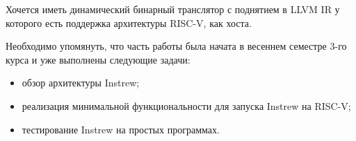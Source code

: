 Хочется иметь динамический бинарный транслятор с поднятием в LLVM IR у которого есть поддержка архитектуры RISC-V, как хоста.

Необходимо упомянуть, что часть работы была начата в весеннем семестре 3-го курса и уже выполнены следующие задачи:
\begin{itemize}
    \item обзор архитектуры Instrew;
    \item реализация минимальной функциональности для запуска Instrew на RISC-V;
    \item тестирование Instrew на простых программах.
\end{itemize}








